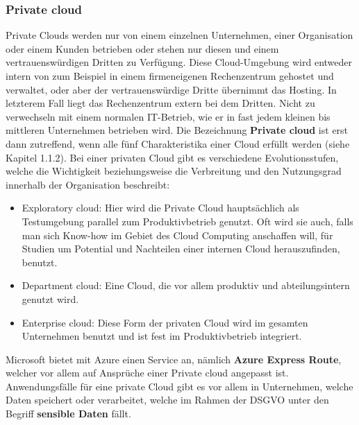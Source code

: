 \subsubsection{Private cloud}
Private Clouds werden nur von einem einzelnen Unternehmen, einer Organisation oder einem Kunden betrieben oder stehen nur diesen und einem vertrauenswürdigen Dritten zu Verfügung. Diese Cloud-Umgebung wird entweder intern von zum Beispiel in einem firmeneigenen Rechenzentrum gehostet und verwaltet, oder aber der vertrauenswürdige Dritte übernimmt das Hosting. In letzterem Fall liegt das Rechenzentrum extern bei dem Dritten. Nicht zu verwechseln mit einem normalen IT-Betrieb, wie er in fast jedem kleinen bis mittleren Unternehmen betrieben wird. Die Bezeichnung \textbf{Private cloud} ist erst dann zutreffend, wenn alle fünf Charakteristika einer Cloud erfüllt werden (siehe Kapitel 1.1.2).
Bei einer privaten Cloud gibt es verschiedene Evolutionsstufen, welche die Wichtigkeit beziehungsweise die Verbreitung und den Nutzungsgrad innerhalb der Organisation beschreibt:
\begin{itemize}
	\item Exploratory cloud: Hier wird die Private Cloud hauptsächlich als Testumgebung parallel zum Produktivbetrieb genutzt. Oft wird sie auch, falls man sich Know-how im Gebiet des Cloud Computing anschaffen will, für Studien um Potential und Nachteilen einer internen Cloud herauszufinden, benutzt.
	\item Department cloud: Eine Cloud, die vor allem produktiv und abteilungsintern genutzt wird.
	\item Enterprise cloud: Diese Form der privaten Cloud wird im gesamten Unternehmen benutzt und ist fest im Produktivbetrieb integriert.
\end{itemize}

Microsoft bietet mit Azure einen Service an, nämlich \textbf{Azure Express Route}, welcher vor allem auf Ansprüche einer Private cloud angepasst ist.
Anwendungsfälle für eine private Cloud gibt es vor allem in Unternehmen, welche Daten speichert oder verarbeitet, welche im Rahmen der DSGVO unter den Begriff \textbf{sensible Daten} fällt.

